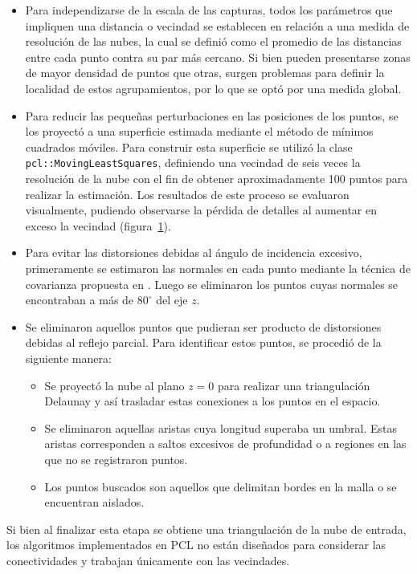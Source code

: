 \begin{itemize}
	\item Para independizarse de la escala de las capturas,
		todos los parámetros que impliquen una distancia o vecindad
		se establecen en relación a una medida de resolución de las nubes,
		la cual se definió como el promedio de las distancias entre cada punto
		contra su par más cercano.
		Si bien pueden presentarse zonas de mayor densidad de puntos que otras,
		surgen problemas para definir la localidad de estos agrupamientos,
		por lo que se optó por una medida global.

	\item Para reducir las pequeñas perturbaciones en las posiciones de los puntos,
		se los proyectó a una superficie estimada mediante el método de mínimos cuadrados móviles.
		Para construir esta superficie se utilizó la clase
		\texttt{pcl::Moving\-Least\-Squares}, definiendo una vecindad de seis veces la
		resolución de la nube con el fin de obtener aproximadamente 100 puntos para
		realizar la estimación.
		Los resultados de este proceso se evaluaron visualmente, pudiendo observarse la pérdida de detalles
		al aumentar en exceso la vecindad (figura~\ref{fig:mls}). 
		\begin{figure}
			\caption{\label{fig:mls}}
		\end{figure}

	\item Para evitar las distorsiones debidas al ángulo de incidencia excesivo,
		primeramente se estimaron las normales en cada punto mediante la técnica de covarianza propuesta en \cite{10.1109/34.334391}.
		Luego se eliminaron los puntos cuyas normales se encontraban a más de $80^{\circ}$ del eje $z$.

	\item Se eliminaron aquellos puntos que pudieran ser producto de distorsiones debidas al reflejo parcial.
		Para identificar estos puntos, se procedió de la siguiente manera:
		\begin{itemize}
			\item {}
				Se proyectó la nube al plano $z=0$ para realizar una triangulación Delaunay y así
				trasladar estas conexiones a los puntos en el espacio.
			\item Se eliminaron aquellas aristas cuya longitud superaba un umbral.
				Estas aristas corresponden a saltos excesivos de profundidad
				o a regiones en las que no se registraron puntos.
			\item Los puntos buscados son aquellos que delimitan bordes en la malla o se encuentran aislados.
		\end{itemize}
\end{itemize}

Si bien al finalizar esta etapa se obtiene una triangulación de la nube de entrada,
los algoritmos implementados en PCL no están diseñados para considerar las conectividades y trabajan únicamente con las vecindades.
